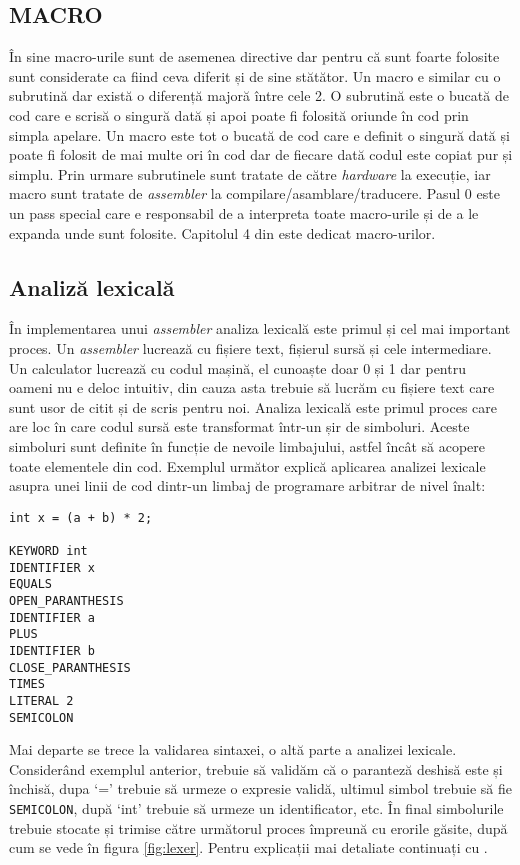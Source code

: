 \documentclass[../main.tex]{subfiles}
\begin{document}
\subsection{MACRO}
În sine macro-urile sunt de asemenea directive dar pentru că sunt foarte folosite sunt considerate ca fiind ceva diferit
și de sine stătător. Un macro e similar cu o subrutină dar există o diferență majoră între cele 2. O subrutină este o
bucată de cod care e scrisă o singură dată și apoi poate fi folosită oriunde în cod prin simpla apelare. Un macro este
tot o bucată de cod care e definit o singură dată și poate fi folosit de mai multe ori în cod dar de fiecare dată codul
este copiat pur și simplu. Prin urmare subrutinele sunt tratate de către \emph{hardware} la execuție, iar macro sunt
tratate de \emph{assembler} la compilare/asamblare/traducere. Pasul 0 este un pass special care e responsabil de a interpreta
toate macro-urile și de a le expanda unde sunt folosite. Capitolul 4 din \cite{asl} este dedicat macro-urilor.

\subsection{Analiză lexicală}
În implementarea unui \emph{assembler} analiza lexicală este primul și cel mai important proces. Un \emph{assembler}
lucrează cu fișiere text, fișierul sursă și cele intermediare. Un calculator lucrează cu codul mașină, el cunoaște doar
0 și 1 dar pentru oameni nu e deloc intuitiv, din cauza asta trebuie să lucrăm cu fișiere text care sunt usor de citit
și de scris pentru noi. Analiza lexicală este primul proces care are loc în care codul sursă este transformat într-un 
șir de simboluri. Aceste simboluri sunt definite în funcție de nevoile limbajului, astfel încât să acopere toate
elementele din cod. Exemplul următor explică aplicarea analizei lexicale asupra unei linii de cod dintr-un limbaj
de programare arbitrar de nivel înalt:

{\ttfamily
    \begin{verbatim}
int x = (a + b) * 2;

KEYWORD int
IDENTIFIER x
EQUALS
OPEN_PARANTHESIS
IDENTIFIER a
PLUS
IDENTIFIER b
CLOSE_PARANTHESIS
TIMES
LITERAL 2
SEMICOLON
    \end{verbatim}
}

Mai departe se trece la validarea sintaxei, o altă parte a analizei lexicale. Considerând exemplul anterior, trebuie să
validăm că o paranteză deshisă este și închisă, dupa `=' trebuie să urmeze o expresie validă, ultimul simbol trebuie să
fie \texttt{SEMICOLON}, după `int' trebuie să urmeze un identificator, etc. În final simbolurile trebuie stocate și trimise
către următorul proces împreună cu erorile găsite, după cum se vede în figura \ref{fig:lexer}. Pentru explicații mai
detaliate continuați cu \cite{lexer}.
\end{document}
